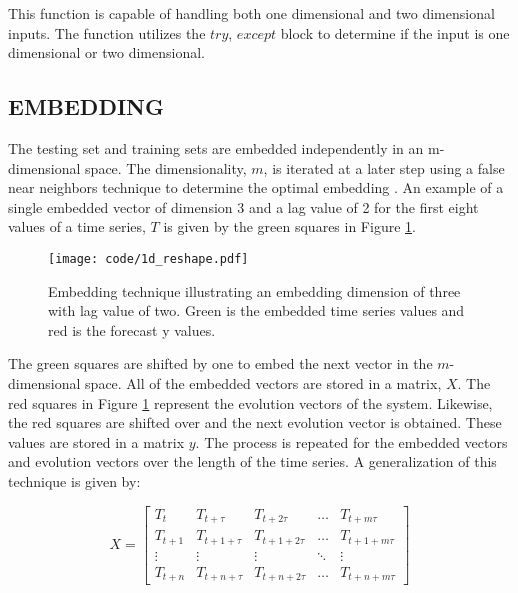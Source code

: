

This function is capable of handling both one dimensional and two dimensional inputs. The function utilizes the $try$, $except$ block to determine if the input is one dimensional or two dimensional.

\subsection{EMBEDDING}
The testing set and training sets are embedded independently in an m-dimensional space. The dimensionality, $m$, is iterated at a later step using a false near neighbors technique to determine the optimal embedding \cite{nonlinear_book}. An example of a single embedded vector of dimension 3 and a lag value of 2 for the first eight values of a time series, $T$ is given by the green squares in Figure \ref{1d_embedding}. 

\begin{figure}[htbp] %
   \centering
   \texttt{[image: code/1d\_reshape.pdf]} 
   \caption{Embedding technique illustrating an embedding dimension of three with lag value of two. Green is the embedded time series values and red is the forecast y values.}
   \label{1d_embedding}
\end{figure}

The green squares are shifted by one to embed the next vector in the $m$-dimensional space. All of the embedded vectors are stored in a matrix, $X$. The red squares in Figure \ref{1d_embedding} represent the evolution vectors of the system. Likewise, the red squares are shifted over and the next evolution vector is obtained. These values are stored in a matrix $y$. The process is repeated for the embedded vectors and evolution vectors over the length of the time series. A generalization of this technique is given by:

\[
X=
\begin{bmatrix}
    T_{t} & T_{t+\tau} & T_{t+2\tau} & \dots  & T_{t+m\tau} \\
    T_{t+1} & T_{t+1 + \tau} & T_{t+1 + 2\tau} & \dots  & T_{t+1 +m\tau} \\
    \vdots & \vdots & \vdots & \ddots & \vdots \\
    T_{t+n} & T_{t+n+\tau} & T_{t+n + 2\tau} & \dots  & T_{t+ n+  m\tau}
\end{bmatrix}
\]

